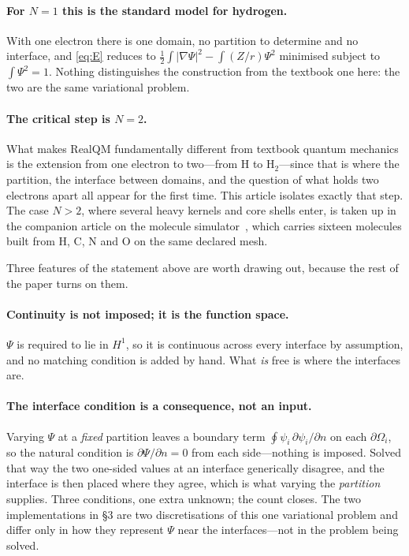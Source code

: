 \documentclass[11pt,a4paper]{article}
\begin{document}
\paragraph{For $N = 1$ this is the standard model for hydrogen.} With one electron there is one
domain, no partition to determine and no interface, and \eqref{eq:E} reduces to
$\tfrac12\!\int|\nabla\Psi|^2 - \int (Z/r)\Psi^2$ minimised subject to $\int\Psi^2 = 1$. Nothing
distinguishes the construction from the textbook one here: the two are the same variational problem.

\paragraph{The critical step is $N = 2$.} What makes RealQM fundamentally different from textbook
quantum mechanics is the extension from one electron to two---from H to H$_2$---since that is where
the partition, the interface between domains, and the question of what holds two electrons apart all
appear for the first time. This article isolates exactly that step. The case $N > 2$, where several
heavy kernels and core shells enter, is taken up in the companion article on the molecule
simulator~\cite{molsim}, which carries sixteen molecules built from H, C, N and O on the same
declared mesh.

Three features of the statement above are worth drawing out, because the rest of the paper turns on
them.

\paragraph{Continuity is not imposed; it is the function space.} $\Psi$ is required to lie in $H^1$,
so it is continuous across every interface by assumption, and no matching condition is added by
hand. What \emph{is} free is where the interfaces are.

\paragraph{The interface condition is a consequence, not an input.} Varying $\Psi$ at a \emph{fixed}
partition leaves a boundary term $\oint \psi_i \,\partial\psi_i/\partial n$ on each $\partial\Omega_i$,
so the natural condition is $\partial\Psi/\partial n = 0$ from each side---nothing is imposed. Solved
that way the two one-sided values at an interface generically disagree, and the interface is then
placed where they agree, which is what varying the \emph{partition} supplies. Three conditions, one
extra unknown; the count closes. The two implementations in \S3 are two discretisations of this one
variational problem and differ only in how they represent $\Psi$ near the interfaces---not in the
problem being solved.
\end{document}
